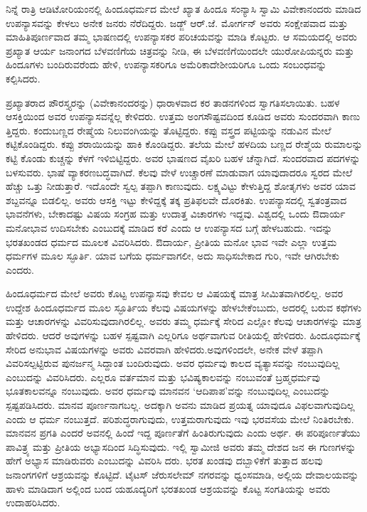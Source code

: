 ನಿನ್ನೆ ರಾತ್ರಿ ಆಡಿಟೋರಿಯಂನಲ್ಲಿ ಹಿಂದೂಧರ್ಮದ ಮೇಲೆ ಖ್ಯಾತ ಹಿಂದೂ ಸಂನ್ಯಾಸಿ ಸ್ವಾಮಿ ವಿವೇಕಾನಂದರು ಮಾಡಿದ ಉಪನ್ಯಾಸವನ್ನು ಕೇಳಲು ಅನೇಕ ಜನರು ನೆರೆದಿದ್ದರು. ಜಡ್ಜ್​ ಆರ್​.ಜೆ. ಮೋರ್ಗನ್​ ಅವರು ಸಂಕ್ಷೇಪವಾದ ಮತ್ತು ಮಾಹಿತಿಪೂರ್ಣವಾದ ತಮ್ಮ ಭಾಷಣದಲ್ಲಿ ಉಪನ್ಯಾಸಕರ ಪರಿಚಯವನ್ನು ಮಾಡಿ ಕೊಟ್ಟರು. ಆ ಸಮಯದಲ್ಲಿ ಅವರು ಪ್ರಖ್ಯಾತ ಆರ್ಯ ಜನಾಂಗದ ಬೆಳವಣಿಗೆಯ ಚಿತ್ರವನ್ನು ನೀಡಿ, ಈ ಬೆಳವಣಿಗೆಯಿಂದಲೇ ಯುರೋಪಿಯನ್ನರು ಮತ್ತು ಹಿಂದೂಗಳು ಬಂದಿರುವರೆಂದು ಹೇಳಿ, ಉಪನ್ಯಾಸಕರಿಗೂ ಅಮೆರಿಕಾದೇಶೀಯರಿಗೂ ಒಂದು ಸಂಬಂಧವನ್ನು ಕಲ್ಪಿಸಿದರು.

ಪ್ರಖ್ಯಾತರಾದ ಪೌರಸ್ತ್ಯರನ್ನು (ವಿವೇಕಾನಂದರನ್ನು) ಧಾರಾಳವಾದ ಕರ ತಾಡನಗಳಿಂದ ಸ್ವಾಗತಿಸಲಾಯಿತು. ಬಹಳ ಆಸಕ್ತಿಯಿಂದ ಅವರ ಉಪನ್ಯಾಸವನ್ನೆಲ್ಲ ಕೇಳಿದರು. ಉತ್ತಮ ಅಂಗಸೌಷ್ಟವದಿಂದ ಕೂಡಿದ ಅವರು ಸುಂದರವಾಗಿ ಕಾಣು ತ್ತಿದ್ದರು. ಕಂದುಬಣ್ಣದ ರೇಷ್ಮೆಯ ನಿಲುವಂಗಿಯನ್ನು ತೊಟ್ಟಿದ್ದರು. ಕಪ್ಪು ವಸ್ತ್ರದ ಪಟ್ಟಿಯನ್ನು ನಡುವಿನ ಮೇಲೆ ಕಟ್ಟಿಕೊಂಡಿದ್ದರು. ಕಪ್ಪು ಶರಾಯಿಯನ್ನು ಹಾಕಿ ಕೊಂಡಿದ್ದರು. ತಲೆಯ ಮೇಲೆ ಹಳದಿಯ ಬಣ್ಣದ ರೇಶ್ಮೆಯ ರುಮಾಲನ್ನು ಕಟ್ಟಿ ಕೊಂಡು ಕುಚ್ಚನ್ನು ಕೆಳಗೆ ಇಳಿಬಿಟ್ಟಿದ್ದರು. ಅವರ ಭಾಷಣದ ವೈಖರಿ ಬಹಳ ಚೆನ್ನಾಗಿದೆ. ಸುಂದರವಾದ ಪದಗಳನ್ನು ಬಳಸುವರು. ಭಾಷೆ ವ್ಯಾಕರಣಬದ್ಧವಾಗಿದೆ. ಕೆಲವು ವೇಳೆ ಉಚ್ಚಾರಣೆ ಮಾಡುವಾಗ ಯಾವುದಾದರೂ ಸ್ವರದ ಮೇಲೆ ಹೆಚ್ಚು ಒತ್ತು ನೀಡುತ್ತಾರೆ. ಇದೊಂದೇ ಸ್ವಲ್ಪ ತಪ್ಪಾಗಿ ಕಾಣುವುದು. ಲಕ್ಷ್ಯವಿಟ್ಟು ಕೇಳುತ್ತಿದ್ದ ಶೋತೃಗಳು ಅವರ ಯಾವ ಶಬ್ದವನ್ನೂ ಬಿಡಲಿಲ್ಲ. ಅವರು ಆಸಕ್ತಿ ಇಟ್ಟು ಕೇಳಿದ್ದಕ್ಕೆ ತಕ್ಕ ಪ್ರತಿಫಲವೇ ದೊರಕಿತು. ಉಪನ್ಯಾಸದಲ್ಲಿ ಸ್ವತಂತ್ರವಾದ ಭಾವನೆಗಳು, ಬೇಕಾದಷ್ಟು ವಿಷಯ ಸಂಗ್ರಹ ಮತ್ತು ಉದಾತ್ತ ವಿಚಾರಗಳು ಇದ್ದವು. ವಿಶ್ವದಲ್ಲಿ ಒಂದು ಔದಾರ್ಯ ಮನೋಭಾವ ಉದಿಸಬೇಕು ಎಂಬುದಕ್ಕೆ ಮಾಡಿದ ಕರೆ ಎಂದು ಆ ಉಪನ್ಯಾಸದ ಬಗ್ಗೆ ಹೇಳಬಹುದು. ಇದನ್ನು ಭರತಖಂಡದ ಧರ್ಮದ ಮೂಲಕ ವಿವರಿಸಿದರು. ಔದಾರ್ಯ, ಪ್ರೀತಿಯ ಮನೋ ಭಾವ ಇವೇ ಎಲ್ಲಾ ಉತ್ತಮ ಧರ್ಮಗಳ ಮೂಲ ಸ್ಫೂರ್ತಿ. ಯಾವ ಬಗೆಯ ಧರ್ಮವಾಗಲೀ, ಅದು ಸಾಧಿಸಬೇಕಾದ ಗುರಿ, ಇವೇ ಆಗಿರಬೇಕು ಎಂದರು.

ಹಿಂದೂಧರ್ಮದ ಮೇಲೆ ಅವರು ಕೊಟ್ಟ ಉಪನ್ಯಾಸವು ಕೇವಲ ಆ ವಿಷಯಕ್ಕೆ ಮಾತ್ರ ಸೀಮಿತವಾಗಿರಲಿಲ್ಲ. ಅವರ ಉದ್ದೇಶ ಹಿಂದೂಧರ್ಮದ ಮೂಲ ಸ್ಫೂರ್ತಿಯ ಕೆಲವು ವಿಷಯಗಳನ್ನು ಹೇಳಬೇಕೆಂಬುದು, ಅದರಲ್ಲಿ ಬರುವ ಕಥೆಗಳು ಮತ್ತು ಆಚಾರಗಳನ್ನು ವಿವರಿಸುವುದಾಗಿರಲಿಲ್ಲ. ಅವರು ತಮ್ಮ ಧರ್ಮಕ್ಕೆ ಸೇರಿದ ಎಲ್ಲೋ ಕೆಲವು ಆಚಾರಗಳನ್ನು ಮಾತ್ರ ಹೇಳಿದರು. ಆದರೆ ಅವುಗಳನ್ನು ಬಹಳ ಸ್ಪಷ್ಟವಾಗಿ ಎಲ್ಲರಿಗೂ ಅರ್ಥವಾಗುವ ರೀತಿಯಲ್ಲಿ ಹೇಳಿದರು. ಹಿಂದೂಧರ್ಮಕ್ಕೆ ಸೇರಿದ ಅನುಭಾವ ವಿಷಯಗಳನ್ನು ಅವರು ವಿವರವಾಗಿ ಹೇಳಿದರು.ಅವುಗಳಿಂದಲೇ, ಅನೇಕ ವೇಳೆ ತಪ್ಪಾಗಿ ವಿವರಿಸಲ್ಪಟ್ಟಿರುವ ಪುನರ್ಜನ್ಮ ಸಿದ್ದಾಂತ ಬಂದಿರುವುದು. ಅವರ ಧರ್ಮವು ಕಾಲದ ವ್ಯತ್ಯಾಸವನ್ನು ನಂಬುವುದಿಲ್ಲ ಎಂಬುದನ್ನು ವಿವರಿಸಿದರು. ಎಲ್ಲರೂ ವರ್ತಮಾನ ಮತ್ತು ಭವಿಷ್ಯಕಾಲವನ್ನು ನಂಬುವಂತೆ ಬ್ರಹ್ಮಧರ್ಮವು ಭೂತಕಾಲವನ್ನೂ ನಂಬುವುದು. ಅವರ ಧರ್ಮವು ಮಾನವನ ‘ಆದಿಪಾಪ’ವನ್ನು ನಂಬುವುದಿಲ್ಲ ಎಂಬುದನ್ನು ಸ್ಪಷ್ಟಪಡಿಸಿದರು. ಮಾನವ ಪೂರ್ಣನಾಗಬಲ್ಲ. ಅದಕ್ಕಾಗಿ ಅವನು ಮಾಡಿದ ಪ್ರಯತ್ನ ಯಾವುದೂ ವಿಫಲವಾಗುವುದಿಲ್ಲ ಎಂದು ಆ ಧರ್ಮ ನಂಬುತ್ತದೆ. ಪರಿಶುದ್ಧರಾಗುವುದು, ಉತ್ತಮರಾಗುವುದು ಇವು ಭರವಸೆಯ ಮೇಲೆ ನಿಂತಿರಬೇಕು. ಮಾನವನ ಪ್ರಗತಿ ಎಂದರೆ ಅವನಲ್ಲಿ ಹಿಂದೆ ಇದ್ದ ಪೂರ್ಣತೆಗೆ ಹಿಂತಿರುಗುವುದು ಎಂದು ಅರ್ಥ. ಈ ಪರಿಪೂರ್ಣತೆಯು ಪಾವಿತ್ರ್ಯ ಮತ್ತು ಪ್ರೀತಿಯ ಅಭ್ಯಾಸದಿಂದ ಸಿದ್ಧಿಸುವುದು. ಇಲ್ಲಿ ಸ್ವಾಮೀಜಿ ಅವರು ತಮ್ಮ ದೇಶದ ಜನ ಈ ಗುಣಗಳನ್ನು ಹೇಗೆ ಅಭ್ಯಾಸ ಮಾಡಿರುವರು ಎಂಬುದನ್ನು ವಿವರಿಸಿ ದರು. ಭರತ ಖಂಡವು ದಬ್ಬಾಳಿಕೆಗೆ ತುತ್ತಾದ ಹಲವು ಜನಾಂಗಗಳಿಗೆ ಆಶ್ರಯವನ್ನು ಕೊಟ್ಟಿದೆ. ಟೈಟಸ್​ ಜೆರುಸಲೇಮ್​ ನಗರವನ್ನು ಧ್ವಂಸಮಾಡಿ, ಅಲ್ಲಿಯ ದೇವಾಲಯವನ್ನು ಹಾಳು ಮಾಡಿದಾಗ ಅಲ್ಲಿಂದ ಬಂದ ಯಹೂದ್ಯರಿಗೆ ಭರತಖಂಡ ಆಶ್ರಯವನ್ನು ಕೊಟ್ಟ ಸಂಗತಿಯನ್ನು ಅವರು ಉದಾಹರಿಸಿದರು.

